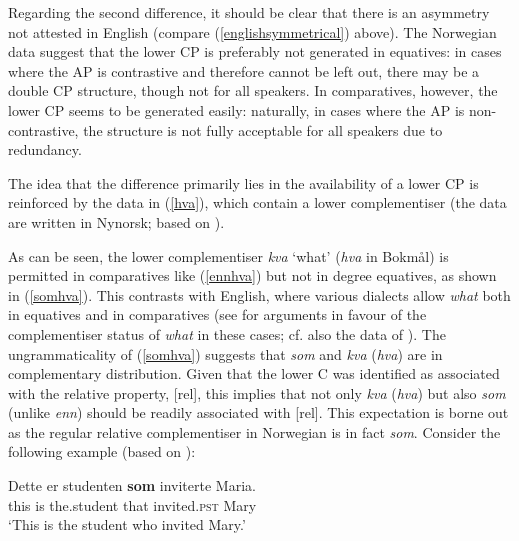 Regarding the second difference, it should be clear that there is an asymmetry not attested in English (compare (\ref{englishsymmetrical}) above). The Norwegian data suggest that the lower CP is preferably not generated in equatives: in cases where the AP is contrastive and therefore cannot be left out, there may be a double CP structure, though not for all speakers. In comparatives, however, the lower CP seems to be generated easily: naturally, in cases where the AP is non-contrastive, the structure is not fully acceptable for all speakers due to redundancy. 

The idea that the difference primarily lies in the availability of a lower CP is reinforced by the data in (\ref{hva}), which contain a lower complementiser (the data are written in Nynorsk; based on \citealt[197--198, 208--209]{bacskaiatkaribaudisch2018}).

\ea \label{hva}
\z
\z

As can be seen, the lower complementiser \textit{kva} `what' (\textit{hva} in Bokmål) is permitted in comparatives like (\ref{ennhva}) but not in degree equatives, as shown in (\ref{somhva}). This contrasts with English, where various dialects allow \textit{what} both in equatives and in comparatives (see \citealt[91]{bacskaiatkari2018langsci} for arguments in favour of the complementiser status of \textit{what} in these cases; cf. also the data of \citealt{izvorski1995}). The ungrammaticality of (\ref{somhva}) suggests that \textit{som} and \textit{kva} (\textit{hva}) are in complementary distribution. Given that the lower C was identified as associated with the relative property, [rel], this implies that not only \textit{kva} (\textit{hva}) but also \textit{som} (unlike \textit{enn}) should be readily associated with [rel]. This expectation is borne out as the regular relative complementiser in Norwegian is in fact \textit{som}. Consider the following example (based on \citealt[185]{bacskaiatkaribaudisch2018}):

\ea \gll	Dette	er studenten \textbf{som} inviterte	Maria.\\
this is the.student	that invited.\textsc{pst} Mary\\
\glt `This is the student who invited Mary.'
\z

